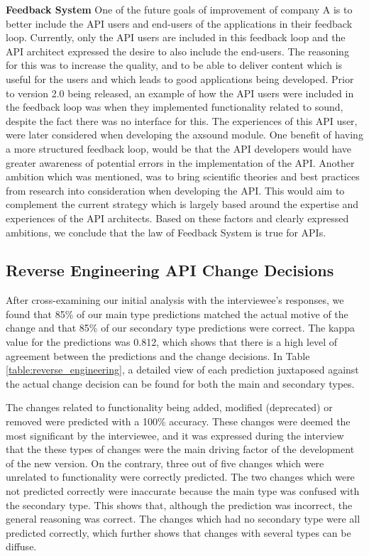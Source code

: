 \documentclass{sig-alternate}
\begin{document}
\smallskip \noindent
\textbf{Feedback System  } 
One of the future goals of improvement of company A is to better include the API users and end-users of the applications in their feedback loop. Currently, only the API users are included in this feedback loop and the API architect expressed the desire to also include the end-users. The reasoning for this was to increase the quality, and to be able to deliver content which is useful for the users and which leads to good applications being developed. Prior to version 2.0 being released, an example of how the API users were included in the feedback loop was when they implemented functionality related to sound, despite the fact there was no interface for this.  The experiences of this API user, were later considered when developing the axsound module. One benefit of having a more structured feedback loop, would be that the API developers would have greater awareness of potential errors in the implementation of the API. Another ambition which was mentioned, was to bring scientific theories and best practices from research into consideration when developing the API. This would aim to complement the current strategy which is largely based around the expertise and experiences of the API architects. Based on these factors and clearly expressed ambitions, we conclude that the law of Feedback System is true for APIs. 



\subsection{Reverse Engineering API Change Decisions}
After cross-examining our initial analysis with the interviewee's responses, we found that 85\% of our main type predictions matched the actual motive of the change and that 85\% of our secondary type predictions were correct. The kappa value \cite{cohen1968weighted} for the predictions was 0.812, which shows that there is a high level of agreement between the predictions and the change decisions. In Table \ref{table:reverse_engineering}, a detailed view of each prediction juxtaposed against the actual change decision can be found for both the main and secondary types.  

The changes related to functionality being added, modified (deprecated) or removed were predicted with a 100\% accuracy. These changes were deemed the most significant by the interviewee, and it was expressed during the interview that the these types of changes were the main driving factor of the development of the new version. On the contrary, three out of five changes which were unrelated to functionality were correctly predicted. The two changes which were not predicted correctly were inaccurate because the main type was confused with the secondary type. This shows that, although the prediction was incorrect, the general reasoning was correct. The changes which had no secondary type were all predicted correctly, which further shows that changes with several types can be diffuse. 
\end{document}
